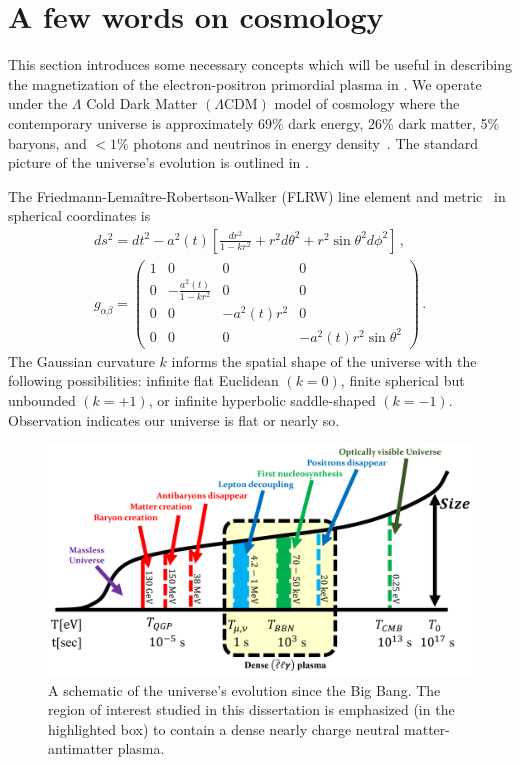 \section{A few words on cosmology}
\label{sec:flrw}
\noindent This section introduces some necessary concepts which will be useful in describing the magnetization of the electron-positron primordial plasma in . We operate under the $\Lambda$ Cold Dark Matter $(\Lambda\mathrm{CDM})$ model of cosmology where the contemporary universe is approximately 69\% dark energy, 26\% dark matter, 5\% baryons, and $<1$\% photons and neutrinos in energy density~\citep{Davis:2003ad,Planck:2018vyg}. The standard picture of the universe's evolution is outlined in .

The Friedmann-Lema{\^i}tre-Robertson-Walker (FLRW) line element and metric~\citep{weinberg1972gravitation} in spherical coordinates is
\begin{gather}
    \label{FLRW} ds^2=dt^2-a^2(t)\left[\frac{dr^2}{1-kr^{2}}+r^{2}d\theta^2+r^{2}\sin\theta^{2}d\phi^2\right]\,,\\
    g_{\alpha\beta}=
    \begin{pmatrix}
        1&0&0&0\\
        0&-\frac{a^{2}(t)}{1-kr^{2}}&0&0\\
        0&0&-a^{2}(t)r^{2}&0\\
        0&0&0&-a^{2}(t)r^{2}\sin\theta^{2}
    \end{pmatrix}\,.
\end{gather}
The Gaussian curvature $k$ informs the spatial shape of the universe with the following possibilities: infinite flat Euclidean $(k=0)$, finite spherical but unbounded $(k=+1)$, or infinite hyperbolic saddle-shaped $(k=-1)$. Observation indicates our universe is flat or nearly so.

\begin{figure}[ht]
 \centering
 \includegraphics[width=0.95\linewidth]{plots/chap01intro/thesis_universe.png}
 \caption{A schematic of the universe's evolution since the Big Bang. The region of interest studied in this dissertation is emphasized (in the highlighted box) to contain a dense nearly charge neutral matter-antimatter plasma.}
 \label{fig:cosmo} 
\end{figure}

